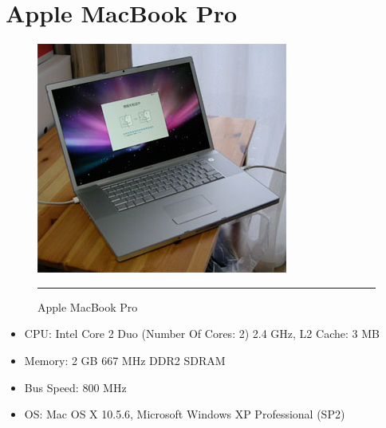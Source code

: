 \chapter{Apple MacBook Pro}
\label{AppendixB}

\begin{figure}[htbp]
  \centering
    \includegraphics{./Primitives/macbookpro.jpg}
    \rule{35em}{0.5pt}
  \caption[Apple MacBook Pro]{Apple MacBook Pro}
\end{figure}

\begin{itemize}
	\item CPU: Intel Core 2 Duo (Number Of Cores: 2) 2.4 GHz, L2 Cache: 3 MB
	\item Memory: 2 GB 667 MHz DDR2 SDRAM
	\item Bus Speed: 800 MHz
	\item OS: Mac OS X 10.5.6, Microsoft Windows XP Professional (SP2)
\end{itemize}
